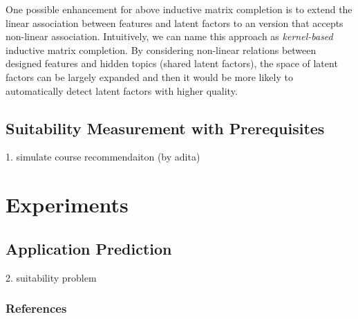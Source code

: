\documentclass{article} %
\begin{document}
One possible enhancement for above inductive matrix completion is to
extend the linear association between features and
latent factors to an version that accepts non-linear association. Intuitively,
we can name this approach as {\it kernel-based} inductive matrix completion.
By considering non-linear relations between designed features and hidden
topics (shared latent factors), the space of latent factors can be largely
expanded and then it would be more likely to automatically detect latent
factors with higher quality. 
 

\subsection{Suitability Measurement with Prerequisites}
1. simulate course recommendaiton (by adita)

\subsection{}

\subsection{}

\section{Experiments}
\subsection{Application Prediction}
2. suitability problem 


\subsubsection*{References}
{}

\end{document}
